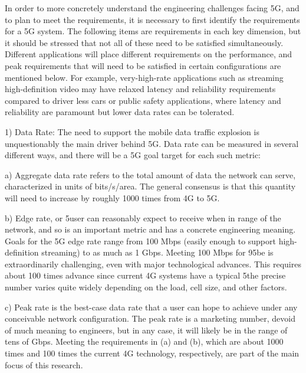 In order to more concretely understand the engineering challenges facing 5G, and to plan to meet the requirements, it is necessary to first identify the requirements for a 5G system. The following items are requirements in each key dimension, but it should be stressed that not all of these need to be satisfied simultaneously. Different applications will place different requirements on the performance, and peak requirements that will need to be satisfied in certain configurations are mentioned below. For example, very-high-rate applications such as streaming high-definition video may have relaxed latency and reliability requirements compared to driver less cars or public safety applications, where latency and reliability are paramount but lower data rates can be tolerated.
\begin{flushleft}1) Data Rate: The need to support the mobile data traffic explosion is unquestionably the main driver behind 5G. Data rate can be measured in several different ways, and there will be a 5G goal target for each such metric:\end{flushleft}
\begin{flushleft}a) Aggregate data rate refers to the total amount of data the network can serve, characterized in units of bits/s/area. The general consensus is that this quantity will need to increase by roughly 1000 times from 4G to 5G.\end{flushleft}
\begin{flushleft}b) Edge rate, or 5user can reasonably expect to receive when in range of the network, and so is an important metric and has a concrete engineering meaning. Goals for the 5G edge rate range from 100 Mbps (easily enough to support high-definition streaming) to as much as 1 Gbps. Meeting 100 Mbps for 95be is extraordinarily challenging, even with major technological advances. This requires about 100 times advance since current 4G systems have a typical 5the precise number varies quite widely depending on the load, cell size, and other factors.\end{flushleft}
\begin{flushleft}c) Peak rate is the best-case data rate that a user can hope to achieve under any conceivable network configuration. The peak rate is a marketing number, devoid of much meaning to engineers, but in any case, it will likely be in the range of tens of Gbps. Meeting the requirements in (a) and (b), which are about 1000 times and 100 times the current 4G technology, respectively, are part of the main focus of this research.\end{flushleft}
